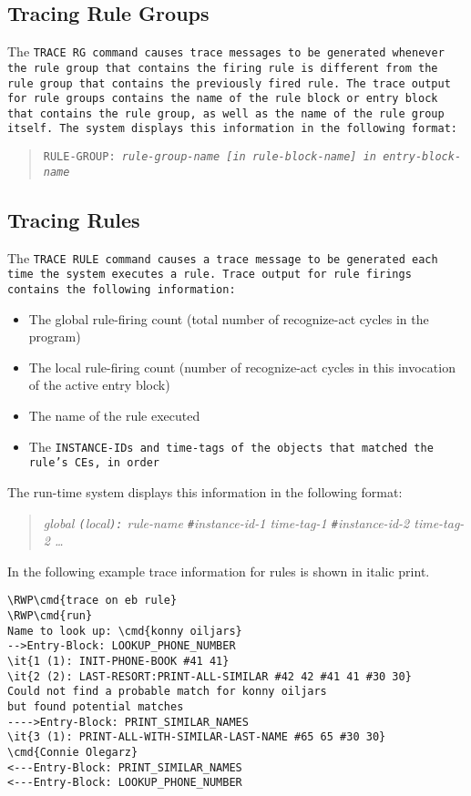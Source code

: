 \subsection{Tracing Rule Groups}

The \tt{TRACE RG} command causes trace messages to be generated
whenever the rule group that contains the firing rule is different
from the rule group that contains the previously fired rule. The trace
output for rule groups contains the name of the rule block or entry
block that contains the rule group, as well as the name of the rule
group itself. The system displays this information in the following
format:

\begin{quote}
  \tt{RULE-GROUP:} \it{rule-group-name} \verb|[in| \it{rule-block-name}\verb|] in|
  \it{entry-block-name}
\end{quote}

\subsection{Tracing Rules}

The \tt{TRACE RULE} command causes a trace message to be generated
each time the system executes a rule. Trace output for rule
firings contains the following information:

\begin{itemize}
\item The global rule-firing count (total number of recognize-act
  cycles in the program)
\item The local rule-firing count (number of recognize-act cycles in
  this invocation of the active entry block)
\item The name of the rule executed
\item The \tt{INSTANCE-ID}s and time-tags of the objects that matched the
  rule's CEs, in order
\end{itemize}
  
The run-time system displays this information in the following format:

\begin{quote}
  \it{global} \verb|(|\it{local}\verb|):| \it{rule-name}
  \verb|#|\it{instance-id-1} \it{time-tag-1}
  \verb|#|\it{instance-id-2} \it{time-tag-2} \ldots
\end{quote}

In the following example trace information for rules is shown in
italic print.

\begin{Verbatim}[commandchars=\\\{\}]
\RWP\cmd{trace on eb rule}
\RWP\cmd{run}
Name to look up: \cmd{konny oiljars}
-->Entry-Block: LOOKUP_PHONE_NUMBER
\it{1 (1): INIT-PHONE-BOOK #41 41}
\it{2 (2): LAST-RESORT:PRINT-ALL-SIMILAR #42 42 #41 41 #30 30}
Could not find a probable match for konny oiljars
but found potential matches
---->Entry-Block: PRINT_SIMILAR_NAMES
\it{3 (1): PRINT-ALL-WITH-SIMILAR-LAST-NAME #65 65 #30 30}
\cmd{Connie Olegarz}
<---Entry-Block: PRINT_SIMILAR_NAMES
<---Entry-Block: LOOKUP_PHONE_NUMBER
\end{Verbatim}


